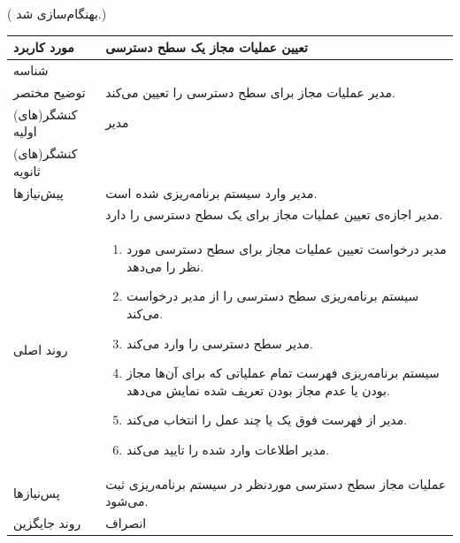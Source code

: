 \newpage
({\color{red} بهنگام‌سازی شد.})
\begin{table}[H]
	\centering
	\begin{tabular}{|p{3cm}|p{10cm}|}
		\hline
		مورد کاربرد & تعیین عملیات مجاز یک سطح دسترسی  \\
		\hline
		شناسه & 
		\stepcounter{usecase_ID}
		\arabic{usecase_ID} \\
		\hline
		توضیح مختصر & مدیر عملیات مجاز برای سطح دسترسی را تعیین می‌کند. \\
		\hline
		کنشگر(های) اولیه & مدیر \\
		\hline
		کنشگر(های) ثانویه &  \\
		\hline
		پیش‌نیازها & مدیر وارد سیستم برنامه‌ریزی شده است. \\
		& مدیر اجازه‌ی تعیین عملیات مجاز برای یک سطح دسترسی را دارد.\\
		\hline
		
		روند اصلی &
		\begin{enumerate}[topsep=0cm,leftmargin=0.5cm]
			\item مدیر درخواست تعیین عملیات مجاز برای سطح دسترسی مورد نظر را می‌دهد.
			\item سیستم برنامه‌ریزی سطح دسترسی را از مدیر درخواست می‌کند.
			\item مدیر سطح دسترسی را وارد می‌کند.
			\item سیستم برنامه‌ریزی فهرست تمام عملیاتی که برای آن‌ها مجاز بودن یا عدم مجاز بودن تعریف شده نمایش می‌دهد.
			\item مدیر از فهرست فوق یک یا چند عمل را انتخاب می‌کند.
			\item مدیر اطلاعات وارد شده را تایید می‌کند.
		\end{enumerate} \\
		
		\hline
		پس‌نیازها & عملیات مجاز سطح دسترسی موردنظر در سیستم برنامه‌ریزی ثبت می‌شود. \\
		\hline
		روند جایگزین & انصراف \\
		\hline
	\end{tabular}
\end{table}



